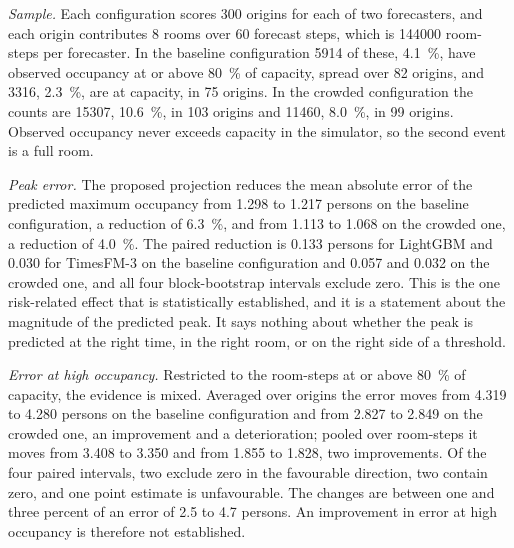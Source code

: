 \documentclass[utf8]{FrontiersinHarvard}
\newif\ifsecondrevisionmarkup
\newcommand{\rev}[1]{\ifsecondrevisionmarkup\textcolor{revisiontwo}{#1}\else#1\fi}
\theoremstyle{plain}
\theoremstyle{definition}
\theoremstyle{remark}
\begin{document}
\rev{\emph{Sample.} Each configuration scores \num{300} origins for each of two forecasters, and each origin contributes \num{8} rooms over \num{60} forecast steps, which is \num{144000} room-steps per forecaster. In the baseline configuration \num{5914} of these, \SI{4.1}{\percent}, have observed occupancy at or above \SI{80}{\percent} of capacity, spread over \num{82} origins, and \num{3316}, \SI{2.3}{\percent}, are at capacity, in \num{75} origins. In the crowded configuration the counts are \num{15307}, \SI{10.6}{\percent}, in \num{103} origins and \num{11460}, \SI{8.0}{\percent}, in \num{99} origins. Observed occupancy never exceeds capacity in the simulator, so the second event is a full room.}

\rev{\emph{Peak error.} The proposed projection reduces the mean absolute error of the predicted maximum occupancy from \num{1.298} to \num{1.217} persons on the baseline configuration, a reduction of \SI{6.3}{\percent}, and from \num{1.113} to \num{1.068} on the crowded one, a reduction of \SI{4.0}{\percent}. The paired reduction is \num{0.133} persons for LightGBM and \num{0.030} for TimesFM-3 on the baseline configuration and \num{0.057} and \num{0.032} on the crowded one, and all four block-bootstrap intervals exclude zero. This is the one risk-related effect that is statistically established, and it is a statement about the magnitude of the predicted peak. It says nothing about whether the peak is predicted at the right time, in the right room, or on the right side of a threshold.}

\rev{\emph{Error at high occupancy.} Restricted to the room-steps at or above \SI{80}{\percent} of capacity, the evidence is mixed. Averaged over origins the error moves from \num{4.319} to \num{4.280} persons on the baseline configuration and from \num{2.827} to \num{2.849} on the crowded one, an improvement and a deterioration; pooled over room-steps it moves from \num{3.408} to \num{3.350} and from \num{1.855} to \num{1.828}, two improvements. Of the four paired intervals, two exclude zero in the favourable direction, two contain zero, and one point estimate is unfavourable. The changes are between one and three percent of an error of \num{2.5} to \num{4.7} persons. An improvement in error at high occupancy is therefore not established.}
\end{document}
